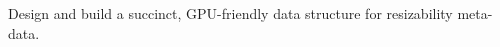 \begin{rproblem}\label{rprob:resizable-maplet-metadata}
Design and build a succinct, GPU-friendly data structure for resizability meta-data.
\end{rproblem}

\begin{comment}
    
Finally, some filters, most notably the quotient filter, can be made \defn{adaptive}~\cite{BenderFaGo18}.  A filter is adaptive if its false-positive probability is at most $\varepsilon$ for every $x\notin S$, even if $x$ is repeatedly queried.  In a standard filter, every time $x$ is queried, the filter returns the same answer.  In an adaptive filter, if $x$ is queried and determined to be a false positive, the filter has the option of adjusting itself so that this query is correctly answered as \textsc{False}.  All provably adaptive filters are based on the quotient filter~\cite{BenderFaGo18,Lee21}, although there are some heuristically adaptive filters based on the cuckoo filter~\cite{Mitzenmacher2020}.



\para{Feature-rich filters, adaptive filters, and dynamic maplets}  
\mfc{Put a paragraph here about how adaptivity has been used to improved: dbg traversals in comp bio (see compented out pragraph); network black lists (MItzenmacher); a third example.}


\end{comment}

